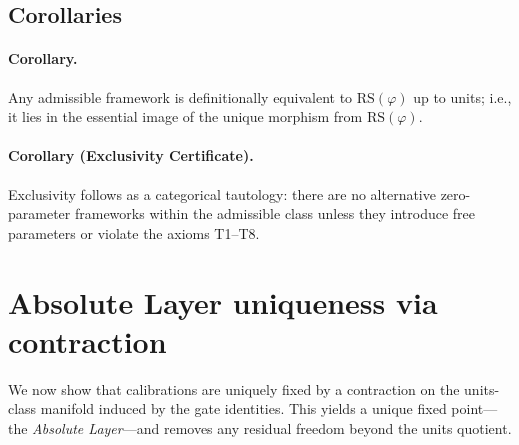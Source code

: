 \documentclass[11pt]{article}
\begin{document}
\subsection{Corollaries}
\paragraph{Corollary.} Any admissible framework is definitionally equivalent to \(\mathrm{RS}(\varphi)\) up to units; i.e., it lies in the essential image of the unique morphism from \(\mathrm{RS}(\varphi)\).

\paragraph{Corollary (Exclusivity Certificate).} Exclusivity follows as a categorical tautology: there are no alternative zero\mbox{-}parameter frameworks within the admissible class unless they introduce free parameters or violate the axioms T1--T8.

\section{Absolute Layer uniqueness via contraction}
We now show that calibrations are uniquely fixed by a contraction on the units\mbox{-}class manifold induced by the gate identities. This yields a unique fixed point---the \emph{Absolute Layer}---and removes any residual freedom beyond the units quotient.
\end{document}
